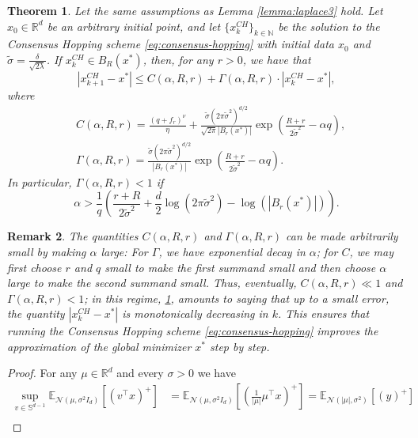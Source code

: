 \documentclass[reqno]{amsart}
\numberwithin{algorithm}{section}
\newcommand{\R}{\mathbb{R}}
\newcommand{\RR}{\mathbb{R}}
\newcommand{\NN}{{\mathbb N}}
\newtheorem{theorem}{Theorem}[section]
\newtheorem{remark}[theorem]{Remark}
\begin{document}
{\begin{theorem}\label{thm:monotonicity}
     Let the same assumptions as Lemma \ref{lemma:laplace3} hold. Let $x_0 \in \RR^d$ be an arbitrary initial point, and let $\{x_k^{CH}\}_{k \in \NN}$ be the solution to the Consensus Hopping scheme \eqref{eq:consensus-hopping} with initial data $x_0$ and $\tilde{\sigma} = \frac{\delta}{\sqrt{2\lambda}}$. If $x_k^{CH}\in B_R(x^*)$, then, for any $r > 0$, we have that
    $$|x_{k+1}^{CH}-x^*|\leq C(\alpha,R,r) + \Gamma(\alpha, R,r)\cdot|x_k^{CH}-x^*|,$$
    where
    \begin{equation*}
        \begin{aligned}
            &C(\alpha, R,r) = \frac{(q+f_r)^\nu}{\eta} + \frac{\tilde\sigma(2\pi\tilde\sigma^2)^{d/2}}{\sqrt{2\pi}|B_r(x^*)|}\exp\left(\frac{R+r}{2\tilde\sigma^2}-\alpha q\right),\\
            & \Gamma(\alpha,R,r) = \frac{\tilde\sigma(2\pi\tilde\sigma^2)^{d/2}}{|B_r(x^*)|} \exp\left(\frac{R+r}{2\tilde\sigma^2}-\alpha q\right).
        \end{aligned}
    \end{equation*}
    In particular, $\Gamma(\alpha,R,r )<1$ if 
    $$\alpha>\frac{1}{q}\left(\frac{r+R}{2\tilde\sigma^2}+\frac{d}{2}\log(2\pi\tilde\sigma^2)-\log(|B_r(x^*)|)\right).$$
\end{theorem}
\begin{remark}
    The quantities $C(\alpha, R, r)$ and $\Gamma(\alpha, R, r)$ can be made arbitrarily small by making $\alpha$ large: For $\Gamma$, we have exponential decay in $\alpha$; for $C$, we may first choose $r$ and $q$ small to make the first summand small and then choose $\alpha$ large to make the second summand small. Thus, eventually, $C(\alpha, R, r) \ll 1$ and $\Gamma(\alpha, R, r) < 1$; in this regime, \cref{thm:monotonicity}, amounts to saying that up to a small error, the quantity $|x_{k}^{CH}-x^*|$ is monotonically decreasing in $k$. This ensures that running the Consensus Hopping scheme \eqref{eq:consensus-hopping} improves the approximation of the global minimizer $x^*$ step by step.
\end{remark}
\begin{proof}
For any $\mu\in\R^d$ and every $\sigma>0$ we have 
\begin{equation}\label{gaussian1}
    \begin{aligned}
        \sup_{v\in\mathbb S^{d-1}}\mathbb E_{\mathcal N\left(\mu, \sigma^2 I_d\right)}\left[(v^\top x)^+ \right] &= \mathbb E_{\mathcal N\left(\mu, \sigma^2 I_d\right)}\left[\left(\frac{1}{|\mu|}\mu^\top x\right)^+ \right] = \mathbb E_{\mathcal N\left(|\mu|, \sigma^2\right)}\left[(y)^+ \right]\\

\end{aligned}
\end{equation}
\end{proof}}
\end{document}
